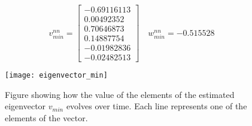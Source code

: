 \begin{equation*}
  v_{min}^{nn} = \begin{bmatrix}
   -0.69116113  \\
   0.00492352  \\
   0.70646873  \\
   0.14887754 \\
   -0.01982836 \\
   -0.02482513
  \end{bmatrix} \quad w_{min}^{nn} = -0.515528
\end{equation*}

\begin{figure}[htbp]
 \centering
 \texttt{[image: eigenvector\_min]}
 \caption{Figure showing how the value of the elements of the estimated eigenvector $v_{min}$ evolves over time. Each line represents one of the elements of the vector.}
 \label{fig:eigenvector_min}
\end{figure}

